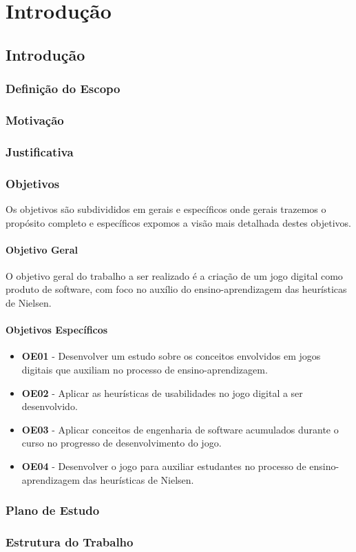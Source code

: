 \part{Introdução}

\chapter[Introdução]{Introdução}



\section{Definição do Escopo}



\section{Motivação}



\section{Justificativa}



\section{Objetivos}

Os objetivos são subdivididos em gerais e específicos onde gerais trazemos o propósito completo e específicos expomos a visão mais detalhada destes objetivos.

\subsection{Objetivo Geral}

O objetivo geral do trabalho a ser realizado é a criação de um jogo digital como produto de software, com foco no auxílio do ensino-aprendizagem das heurísticas de Nielsen.

\subsection{Objetivos Específicos}
\begin{itemize}
\item \textbf{OE01} - Desenvolver um estudo sobre os conceitos envolvidos em jogos digitais que auxiliam no processo de ensino-aprendizagem.
\item \textbf{OE02} - Aplicar as heurísticas de usabilidades no jogo digital a ser desenvolvido.
\item \textbf{OE03} - Aplicar conceitos de engenharia de software acumulados durante o curso no progresso de desenvolvimento do jogo.
\item \textbf{OE04} - Desenvolver o jogo para auxiliar estudantes no processo de ensino-aprendizagem das heurísticas de Nielsen.
\end{itemize}

\section{Plano de Estudo}



\section{Estrutura do Trabalho}

